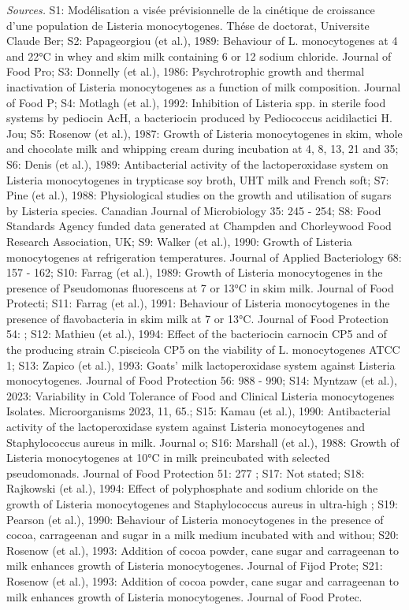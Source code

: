 \begin{table}[p]
\vspace{4pt}\begin{minipage}{0.96\textwidth}\scriptsize\textit{Sources.} S1: Modélisation a visée prévisionnelle de la cinétique de croissance d'une population de Listeria monocytogenes. Thése de doctorat, Universite Claude Ber; S2: Papageorgiou (et al.), 1989: Behaviour of L. monocytogenes at 4 and 22°C in whey and skim milk containing 6 or 12 sodium chloride. Journal of Food Pro; S3: Donnelly (et al.), 1986: Psychrotrophic growth and thermal inactivation of Listeria monocytogenes as a function of milk composition. Journal of Food P; S4: Motlagh (et al.), 1992: Inhibition of Listeria spp. in sterile food systems by pediocin AcH, a bacteriocin produced by Pediococcus acidilactici H. Jou; S5: Rosenow (et al.), 1987: Growth of Listeria monocytogenes in skim, whole and chocolate milk and whipping cream during incubation at 4, 8, 13, 21 and 35; S6: Denis (et al.), 1989: Antibacterial activity of the lactoperoxidase system on Listeria monocytogenes in trypticase soy broth, UHT milk and French soft; S7: Pine (et al.), 1988: Physiological studies on the growth and utilisation of sugars by Listeria species. Canadian Journal of Microbiology 35: 245 - 254; S8: Food Standards Agency funded data generated at Champden and Chorleywood Food Research Association, UK; S9: Walker (et al.), 1990: Growth of Listeria monocytogenes at refrigeration temperatures. Journal of Applied Bacteriology 68: 157 - 162; S10: Farrag (et al.), 1989: Growth of Listeria monocytogenes in the presence of Pseudomonas fluorescens at 7 or 13°C in skim milk. Journal of Food Protecti; S11: Farrag (et al.), 1991: Behaviour of Listeria monocytogenes in the presence of flavobacteria in skim milk at 7 or 13°C. Journal of Food Protection 54: ; S12: Mathieu (et al.), 1994: Effect of the bacteriocin carnocin CP5 and of the producing strain C.piscicola CP5 on the viability of L. monocytogenes ATCC 1; S13: Zapico (et al.), 1993: Goats' milk lactoperoxidase system against Listeria monocytogenes. Journal of Food Protection 56: 988 - 990; S14: Myntzaw (et al.), 2023: Variability in Cold Tolerance of Food and Clinical Listeria monocytogenes Isolates. Microorganisms 2023, 11, 65.; S15: Kamau (et al.), 1990: Antibacterial activity of the lactoperoxidase system against Listeria monocytogenes and Staphylococcus aureus in milk. Journal o; S16: Marshall (et al.), 1988: Growth of Listeria monocytogenes at 10°C in milk preincubated with selected pseudomonads. Journal of Food Protection 51: 277 ; S17: Not stated; S18: Rajkowski (et al.), 1994: Effect of polyphosphate and sodium chloride on the growth of Listeria monocytogenes and Staphylococcus aureus in ultra-high ; S19: Pearson (et al.), 1990: Behaviour of Listeria monocytogenes in the presence of cocoa, carrageenan and sugar in a milk medium incubated with and withou; S20: Rosenow (et al.), 1993: Addition of cocoa powder, cane sugar and carrageenan to milk enhances growth of Listeria monocytogenes. Journal of Fijod Prote; S21: Rosenow (et al.), 1993: Addition of cocoa powder, cane sugar and carrageenan to milk enhances growth of Listeria monocytogenes. Journal of Food Protec.\end{minipage}
\end{table}
